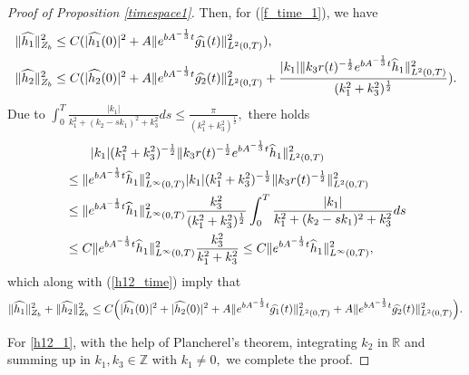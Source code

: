 \documentclass[12pt, reqno]{amsart}
\numberwithin{equation}{section}
\begin{document}
\begin{proof}[Proof of Proposition \ref{timespace1}]
		
		Then, for (\ref{f_time_1}), we have 
		\begin{equation}\label{h12_time}
			\begin{aligned}
				&\|\widehat{h_1}\|^2_{Z_b}
				\leq C(|\widehat{h_1}(0)|^2
				+A\|{\rm e}^{bA^{-\frac13 }t}
				\widehat{g_1}(t)\|^2_{L^2(0,T)}),\\
				&\|\widehat{h_2}\|^2_{Z_b}
				\leq C(|\widehat{h_2}(0)|^2
				+A\|{\rm e}^{bA^{-\frac13 }t}
				\widehat{g_2}(t)\|^2_{L^2(0,T)}
				+\frac{|k_1|\|k_3r(t)^{-\frac{1}{2}}{\rm e}^{bA^{-\frac13 }t}\widehat{h}_1\|_{L^{2}(0,T)}^2}
				{(k_1^2+k_3^2)^{\frac{1}{2}}}).
			\end{aligned}
		\end{equation}
		Due to $ \int_0^T \frac{|k_1|}{k_1^2+(k_2-sk_1)^2+k_3^2}ds
		\leq \frac{\pi}{(k_1^2+k_3^2)^{\frac{1}{2}}}, $ there holds
		\begin{align*}
			&\qquad|k_1|(k_1^2+k_3^2)^{-\frac{1}{2}}
			\|k_3r(t)^{-\frac{1}{2}}{\rm e}^{bA^{-\frac13 }t}\widehat{h}_1\|_{L^{2}(0,T)}^2
			\\
			&\leq\|{\rm e}^{bA^{-\frac13 }t}\widehat{h}_1\|_{L^{\infty}(0,T)}^2
			|k_1|(k_1^2+k_3^2)^{-\frac{1}{2}}
			\|k_3r(t)^{-\frac{1}{2}}\|_{L^{2}(0,T)}^2\\
			&\leq\|{\rm e}^{bA^{-\frac13 }t}\widehat{h}_1\|_{L^{\infty}(0,T)}^2
			\frac{k_3^2}{(k_1^2+k_3^2)^{\frac{1}{2}}}
			\int_0^T \frac{|k_1|}{k_1^2+(k_2-sk_1)^2+k_3^2}ds\\
			&\leq C\|{\rm e}^{bA^{-\frac13 }t}\widehat{h}_1\|_{L^{\infty}(0,T)}^2
			\frac{k_3^2}{k_1^2+k_3^2}
			\leq C\|{\rm e}^{bA^{-\frac13 }t}\widehat{h}_1\|_{L^{\infty}(0,T)}^2,
		\end{align*}	
		which along with (\ref{h12_time}) imply that 
		\begin{equation}\label{h12_1}
			\|\widehat{h_1}\|^2_{Z_b}+\|\widehat{h_2}\|^2_{Z_b}
			\leq C\Big(|\widehat{h_1}(0)|^2+|\widehat{h_2}(0)|^2
			+A\|{\rm e}^{bA^{-\frac13 }t}\widehat{g_1}(t)\|^2_{L^2(0,T)}
			+A\|{\rm e}^{bA^{-\frac13 }t}\widehat{g_2}(t)\|^2_{L^2(0,T)}\Big).
		\end{equation}
		
		For \eqref{h12_1}, with the help of Plancherel's theorem, integrating $k_2$ in $\mathbb{R}$ and summing up in 
		$k_1,k_3\in\mathbb{Z}$ with $k_1\neq0,$ we complete the proof.
	\end{proof}
	
	
\end{document}
